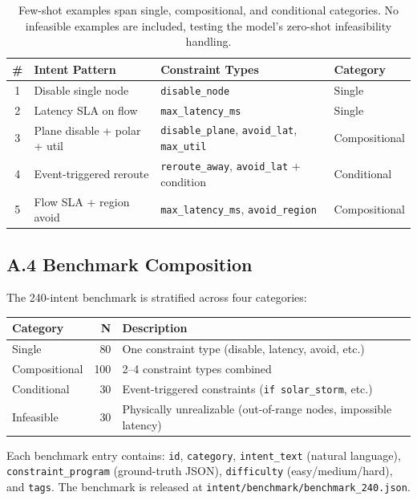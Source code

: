 \begin{table}[h]
\centering
\small
\begin{tabular}{clll}
\toprule
\textbf{\#} & \textbf{Intent Pattern} & \textbf{Constraint Types} & \textbf{Category} \\
\midrule
1 & Disable single node & \texttt{disable\_node} & Single \\
2 & Latency SLA on flow & \texttt{max\_latency\_ms} & Single \\
3 & Plane disable + polar + util & \texttt{disable\_plane}, \texttt{avoid\_lat}, \texttt{max\_util} & Compositional \\
4 & Event-triggered reroute & \texttt{reroute\_away}, \texttt{avoid\_lat} + condition & Conditional \\
5 & Flow SLA + region avoid & \texttt{max\_latency\_ms}, \texttt{avoid\_region} & Compositional \\
\bottomrule
\end{tabular}
\caption*{Few-shot examples span single, compositional, and conditional categories.
No infeasible examples are included, testing the model's zero-shot
infeasibility handling.}
\end{table}

\subsection*{A.4 Benchmark Composition}

The 240-intent benchmark is stratified across four categories:

\begin{table}[h]
\centering
\small
\begin{tabular}{lrl}
\toprule
\textbf{Category} & \textbf{N} & \textbf{Description} \\
\midrule
Single & 80 & One constraint type (disable, latency, avoid, etc.) \\
Compositional & 100 & 2--4 constraint types combined \\
Conditional & 30 & Event-triggered constraints (\texttt{if solar\_storm}, etc.) \\
Infeasible & 30 & Physically unrealizable (out-of-range nodes, impossible latency) \\
\bottomrule
\end{tabular}
\end{table}

\noindent Each benchmark entry contains: \texttt{id}, \texttt{category},
\texttt{intent\_text} (natural language), \texttt{constraint\_program}
(ground-truth JSON), \texttt{difficulty} (easy/medium/hard), and
\texttt{tags}. The benchmark is released at
\texttt{intent/benchmark/benchmark\_240.json}.

